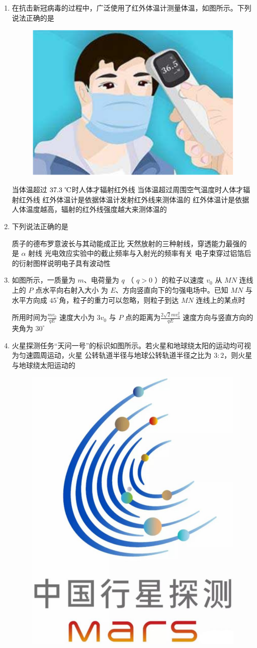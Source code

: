 \begin{enumerate}


\item
在抗击新冠病毒的过程中，广泛使用了红外体温计测量体温，如图所示。下列说法正确的是  
\begin{figure}[h!]
\centering
\includegraphics[width=0.2\linewidth]{picture/screenshot043}
\end{figure}


\fourchoices
{当体温超过 $ 37.3 \ \celsius $时人体才辐射红外线}
{当体温超过周围空气温度时人体才辐射红外线}
{红外体温计是依据体温计发射红外线来测体温的}
{红外体温计是依据人体温度越高，辐射的红外线强度越大来测体温的}



\item
下列说法正确的是  


\fourchoices
{质子的德布罗意波长与其动能成正比}
{天然放射的三种射线，穿透能力最强的是 $ \alpha $ 射线}
{光电效应实验中的截止频率与入射光的频率有关}
{电子束穿过铝箔后的衍射图样说明电子具有波动性}


\item
如图所示，一质量为 $ m $、电荷量为 $ q $ （ $ q>0 $ ）的粒子以速度 $ v_{0} $ 从 $ MN $ 连线上的 $ P $ 点水平向右射入大小
为 $ E $、方向竖直向下的匀强电场中。已知 $ MN $ 与水平方向成 $ 45 ^{ \circ } $角，粒子的重力可以忽略，则粒子到达 $ MN $
连线上的某点时  
\begin{figure}[h!]
\centering

\end{figure}


\fourchoices
{所用时间为$\frac{m v_{0}}{q E}$}
{速度大小为 $ 3 v_{0} $}
{与 $ P $ 点的距离为$\frac{2 \sqrt{2} m v_{0}^{2}}{q E}$}
{速度方向与竖直方向的夹角为 $ 30 ^{ \circ } $}


\item
火星探测任务“天问一号”的标识如图所示。若火星和地球绕太阳的运动均可视为匀速圆周运动，火星
公转轨道半径与地球公转轨道半径之比为 $ 3:2 $，则火星与地球绕太阳运动的  
\begin{figure}[h!]
\centering
\includegraphics[width=0.17\linewidth]{picture/screenshot045}
\end{figure}



\end{enumerate}
